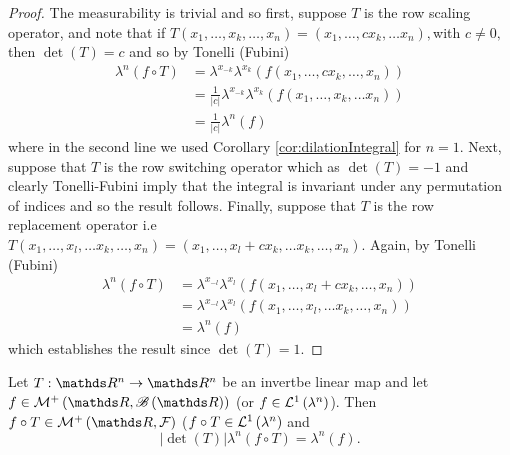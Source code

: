 \begin{proof}
The measurability is trivial and so first, suppose $T$ is the row
scaling operator, and note that if $T\left(x_{1},\ldots,x_{k},\ldots,x_{n}\right)=\left(x_{1},\ldots,cx_{k},\ldots x_{n}\right),$with
$c\ne0,$then $\det\left(T\right)=c$ and so by Tonelli (Fubini)
\begin{align*}
\lambda^{n}\left(f\circ T\right) & =\lambda^{x_{-k}}\lambda^{x_{k}}\left(f\left(x_{1},\ldots,cx_{k},\ldots,x_{n}\right)\right)\\
 & =\frac{1}{\lvert c\rvert}\lambda^{x_{-k}}\lambda^{x_{k}}\left(f\left(x_{1},\ldots,x_{k},\ldots x_{n}\right)\right)\\
 & =\frac{1}{\lvert c\rvert}\lambda^{n}\left(f\right)
\end{align*}
where in the second line we used Corollary \ref{cor:dilationIntegral}
for $n=1$. Next, suppose that $T$ is the row switching operator
which as $\det\left(T\right)=-1$ and clearly Tonelli-Fubini imply
that the integral is invariant under any permutation of indices and
so the result follows. Finally, suppose that $T$ is the row replacement
operator i.e $T\left(x_{1},\ldots,x_{l},\ldots x_{k},\ldots,x_{n}\right)=\left(x_{1},\ldots,x_{l}+cx_{k},\ldots x_{k},\ldots,x_{n}\right)$.
Again, by Tonelli (Fubini)
\begin{align*}
\lambda^{n}\left(f\circ T\right) & =\lambda^{x_{-l}}\lambda^{x_{l}}\left(f\left(x_{1},\ldots,x_{l}+cx_{k},\ldots,x_{n}\right)\right)\\
 & =\lambda^{x_{-l}}\lambda^{x_{l}}\left(f\left(x_{1},\ldots,x_{l},\ldots x_{k},\ldots,x_{n}\right)\right)\\
 & =\lambda^{n}\left(f\right)
\end{align*}
which establishes the result since $\det\left(T\right)=1.$
\end{proof}
\begin{lem}
\label{lem:changeOfVariablesLinear}Let $T:\R^{n}\to\R^{n}$ be an
invertbe linear map and let $f\in\mathcal{M}^{+}\left(\R,\borel\left(\R\right)\right)$
(or $f\in\mathcal{L}^{1}\left(\lambda^{n}\right)$). Then $f\circ T\in\mathcal{M}^{+}\left(\R,\F\right)$
($f\circ T\in\mathcal{L}^{1}\left(\lambda^{n}\right)$ and
\[
\lvert\det\left(T\right)\rvert\lambda^{n}\left(f\circ T\right)=\lambda^{n}\left(f\right).
\]
\end{lem}

